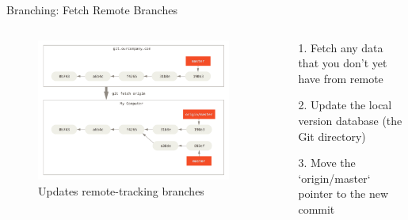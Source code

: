 \begin{frame}[fragile]{Branching: Fetch Remote Branches}
  \begin{columns}
    \begin{column}{0.7\textwidth}
      \begin{figure}
        \includegraphics[width=0.9\textwidth]{branching/remote-branches-3}
        \caption{Updates remote-tracking branches}
      \end{figure}
    \end{column}
    \begin{column}{0.3\textwidth}
      \begin{flushleft}
        1. Fetch any data that you don’t yet have from remote
      \end{flushleft}
      \begin{flushleft}
        2. Update the local version database (the Git directory)
      \end{flushleft}
      \begin{flushleft}
        3. Move the `origin/master` pointer to the new commit
      \end{flushleft}
    \end{column}
  \end{columns}
\end{frame}
